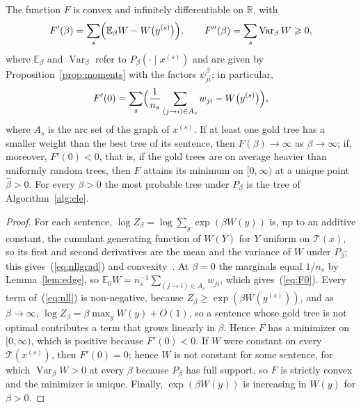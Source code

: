 \documentclass[mathematics,article,submit,pdftex,oneauthor]{Definitions/mdpi}
\newcommand{\T}{\mathcal T}
\newcommand{\R}{\mathbb R}
\newcommand{\E}{\mathbb E}
\newcommand{\Var}{\operatorname{Var}}
\begin{document}
\begin{Proposition}\label{prop:calibration}
The function $F$ is convex and infinitely differentiable on $\R$, with
\begin{equation}\label{eq:nllgrad}
F'(\beta)=\sum_s\Bigl(\E_\beta W-W\bigl(y^{(s)}\bigr)\Bigr),\qquad F''(\beta)=\sum_s\Var_\beta W\geqslant0,
\end{equation}
where $\E_\beta$ and $\Var_\beta$ refer to $P_\beta(\cdot\mid x^{(s)})$ and are given by Proposition~\ref{prop:moments} with the factors $\psi_{ji}^\beta$; in particular,
\begin{equation}\label{eq:F0}
F'(0)=\sum_s\Bigl(\frac{1}{n_s}\sum_{(j\to i)\in A_s}w_{ji}-W\bigl(y^{(s)}\bigr)\Bigr),
\end{equation}
where $A_s$ is the arc set of the graph of $x^{(s)}$.
If at least one gold tree has a smaller weight than the best tree of its sentence, then $F(\beta)\to\infty$ as $\beta\to\infty$; if, moreover, $F'(0)<0$, that is, if the gold trees are on average heavier than uniformly random trees, then $F$ attains its minimum on $[0,\infty)$ at a unique point $\hat\beta>0$.
For every $\beta>0$ the most probable tree under $P_\beta$ is the tree of Algorithm~\ref{alg:cle}.
\end{Proposition}
\begin{proof}
For each sentence, $\log Z_\beta=\log\sum_y\exp(\beta W(y))$ is, up to an additive constant, the cumulant generating function of $W(Y)$ for $Y$ uniform on $\T(x)$, so its first and second derivatives are the mean and the variance of $W$ under $P_\beta$; this gives~(\ref{eq:nllgrad}) and convexity~\cite{WainwrightJordan2008}.
At $\beta=0$ the marginals equal $1/n_s$ by Lemma~\ref{lem:edge}, so $\E_0W=n_s^{-1}\sum_{(j\to i)\in A_s}w_{ji}$, which gives~(\ref{eq:F0}).
Every term of~(\ref{eq:nll}) is non-negative, because $Z_\beta\geqslant\exp(\beta W(y^{(s)}))$, and as $\beta\to\infty$, $\log Z_\beta=\beta\max_yW(y)+O(1)$, so a sentence whose gold tree is not optimal contributes a term that grows linearly in $\beta$.
Hence $F$ has a minimizer on $[0,\infty)$, which is positive because $F'(0)<0$.
If $W$ were constant on every $\T(x^{(s)})$, then $F'(0)=0$; hence $W$ is not constant for some sentence, for which $\Var_\beta W>0$ at every $\beta$ because $P_\beta$ has full support, so $F$ is strictly convex and the minimizer is unique.
Finally, $\exp(\beta W(y))$ is increasing in $W(y)$ for $\beta>0$.
\end{proof}
\end{document}
